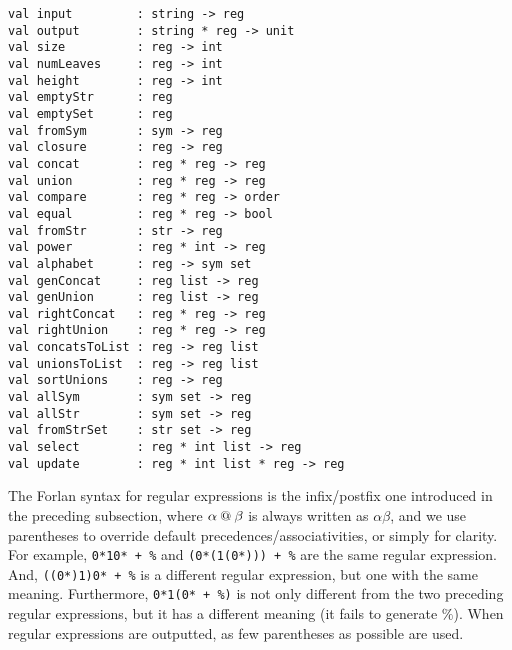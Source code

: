 \begin{verbatim}
val input         : string -> reg
val output        : string * reg -> unit
val size          : reg -> int
val numLeaves     : reg -> int
val height        : reg -> int
val emptyStr      : reg
val emptySet      : reg
val fromSym       : sym -> reg
val closure       : reg -> reg
val concat        : reg * reg -> reg
val union         : reg * reg -> reg
val compare       : reg * reg -> order
val equal         : reg * reg -> bool
val fromStr       : str -> reg
val power         : reg * int -> reg
val alphabet      : reg -> sym set
val genConcat     : reg list -> reg
val genUnion      : reg list -> reg
val rightConcat   : reg * reg -> reg
val rightUnion    : reg * reg -> reg
val concatsToList : reg -> reg list
val unionsToList  : reg -> reg list
val sortUnions    : reg -> reg
val allSym        : sym set -> reg
val allStr        : sym set -> reg
val fromStrSet    : str set -> reg
val select        : reg * int list -> reg
val update        : reg * int list * reg -> reg
\end{verbatim}

The Forlan syntax for regular expressions is the infix/postfix one
%
%
introduced in the preceding subsection, where $\alpha\mathbin{@}\beta$
is always written as $\alpha\beta$, and we use parentheses
to override default precedences/associativities, or simply
for clarity.
For example, \texttt{0*10* + \%} and \texttt{(0*(1(0*))) + \%}
are the same regular expression.  And, \texttt{((0*)1)0* + \%}
is a different regular expression, but one with the same meaning.
Furthermore, \texttt{0*1(0* + \%)} is not only different from
the two preceding regular expressions, but it has a different
meaning (it fails to generate $\%$).
When regular expressions are outputted, as few parentheses as
possible are used.

